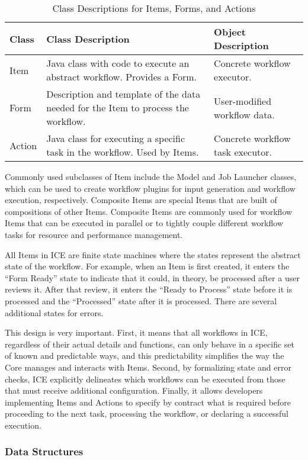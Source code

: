 \begin{table*}[t]
\begin{tabularx}{\textwidth}{|l|X|l|}
\hline
Class & Class Description & Object Description\tabularnewline\hline
Item & Java class with code to execute an abstract workflow. Provides a
Form. & Concrete workflow executor.\tabularnewline\hline
Form & Description and template of the data needed for the Item to
process the workflow. & User-modified workflow data.\tabularnewline\hline
Action & Java class for executing a specific task in the workflow. Used
by Items. & Concrete workflow task executor.\tabularnewline\hline
\end{tabularx}
\caption{Class Descriptions for Items, Forms, and Actions}
\end{table*}

Commonly used subclasses of Item include the Model and Job Launcher classes, which can be  used to create workflow plugins for input generation and workflow execution, respectively. Composite Items are special Items that are built of compositions of other Items. Composite Items are commonly used for workflow Items that can be executed in parallel or to tightly couple different workflow tasks for resource and performance management.

All Items in ICE are finite state machines where the states represent
the abstract state of the workflow. For example, when an Item is first
created, it enters the ``Form Ready'' state to indicate that it could,
in theory, be processed after a user reviews it. After that review, it
enters the ``Ready to Process'' state before it is processed and 
the ``Processed'' state after it is processed. There are several additional 
states for errors.

This design is very important. First, it means that all workflows in
ICE, regardless of their actual details and functions, can only behave in
a specific set of known and predictable ways, and this predictability 
simplifies the way the Core manages and interacts with Items. Second, by
formalizing state and error checks, ICE explicitly delineates which workflows 
can be executed from those that must receive additional configuration. 
Finally, it allows developers implementing Items and
Actions to specify by contract what is required before proceeding to the
next task, processing the workflow, or declaring a successful execution.

\subsubsection{Data Structures}

